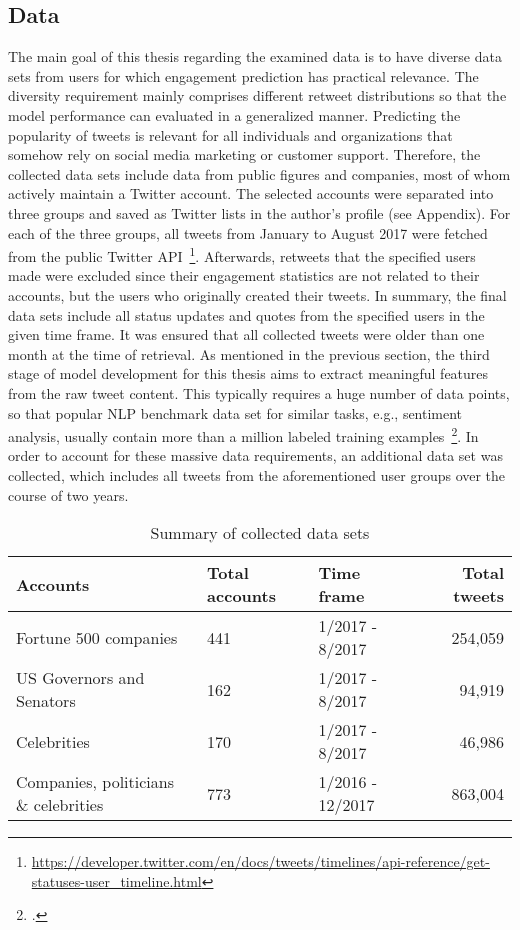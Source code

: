 \subsection{Data}
\label{sec:data_collection}

The main goal of this thesis regarding the examined data is to have diverse
data sets from users for which engagement prediction has practical relevance.
The diversity requirement mainly comprises different retweet distributions
so that the model performance can evaluated in a generalized manner.
Predicting the popularity of tweets is relevant for all individuals and
organizations that somehow rely on social media marketing or customer support.
Therefore, the collected data sets include data from public figures and
companies, most of whom actively maintain a Twitter account.
The selected accounts were separated into three groups and saved as Twitter lists
in the author's profile (see Appendix).
For each of the three groups, all tweets from January to August 2017 were
fetched from the public Twitter API~\footnote{\url{https://developer.twitter.com/en/docs/tweets/timelines/api-reference/get-statuses-user_timeline.html}}.
Afterwards, retweets that the specified users made were excluded since their
engagement statistics are not related to their accounts, but the users who
originally created their tweets.
In summary, the final data sets include all status updates and quotes from the
specified users in the given time frame.
It was ensured that all collected tweets were older than one month 
at the time of retrieval.
As mentioned in the previous section, the third stage of model development
for this thesis aims to extract meaningful features from the raw tweet content.
This typically requires a huge number of data points, so that popular NLP benchmark
data set for similar tasks, e.g., sentiment analysis, usually contain more than
a million labeled training examples~\footcite{Go2009}.
In order to account for these massive data requirements, an additional data set was
collected, which includes all tweets from the aforementioned user groups over
the course of two years.

\begin{table}
\begin{tabular}{lllr}
\toprule
  Accounts & Total accounts & Time frame & Total tweets \\
\midrule
  Fortune 500 companies & 441 & 1/2017 - 8/2017 & 254,059 \\
  US Governors and Senators & 162 & 1/2017 -  8/2017 & 94,919 \\
  Celebrities & 170 & 1/2017 - 8/2017 & 46,986 \\
  Companies, politicians \& celebrities & 773 & 1/2016 - 12/2017 & 863,004 \\
\bottomrule
\end{tabular}
\caption{Summary of collected data sets}
\label{tab:dataset_summary}
\end{table}

